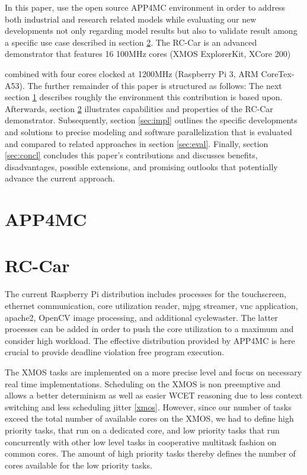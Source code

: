\documentclass [a4paper,final,conference,10pt]{IDAACS}
\begin{document}
In this paper, use the open source APP4MC environment in order to address both industrial and research related models while evaluating our new developments not only regarding model results but also to validate result among a specific use case described in section \ref{sec:rccar}. The RC-Car is an advanced demonstrator that features 16 100MHz cores (XMOS ExplorerKit, XCore 200) 

combined with four cores clocked at 1200MHz (Raspberry Pi 3, ARM CoreTex-A53).
The further remainder of this paper is structured as follows: The next section \ref{sec:app4mc} describes roughly the environment this contribution is based upon. Afterwards, section \ref{sec:rccar} illustrates capabilities and properties of the RC-Car demonstrator. Subsequently, section \ref{sec:impl} outlines the specific developments and solutions to precise modeling and software parallelization that is evaluated and compared to related approaches in section \ref{sec:eval}. Finally, section \ref{sec:concl} concludes this paper's contributions and discusses benefits, disadvantages, possible extensions, and promising outlooks that potentially advance the current approach.


\section{APP4MC}
\label{sec:app4mc}

\section{RC-Car}
\label{sec:rccar}
The current Raspberry Pi distribution includes processes for the touchscreen, ethernet communication, core utilization reader, mjpg streamer, vnc application, apache2, OpenCV image processing, and additional cyclewaster. The latter processes can be added in order to push the core utilization to a maximum and consider high workload. The effective distribution provided by APP4MC is here crucial to provide deadline violation free program execution. 

The XMOS tasks are implemented on a more precise level and focus on necessary real time implementations. Scheduling on the XMOS is non preemptive and allows a better determinism as well as easier WCET reasoning due to less context switching and less scheduling jitter \ref{xmos}. However, since our number of tasks exceed the total number of available cores on the XMOS, we had to define high priority tasks, that run on a dedicated core, and low priority tasks that run concurrently with other low level tasks in cooperative multitask fashion on common cores. The amount of high priority tasks thereby defines the number of cores available for the low priority tasks. 
\end{document}

